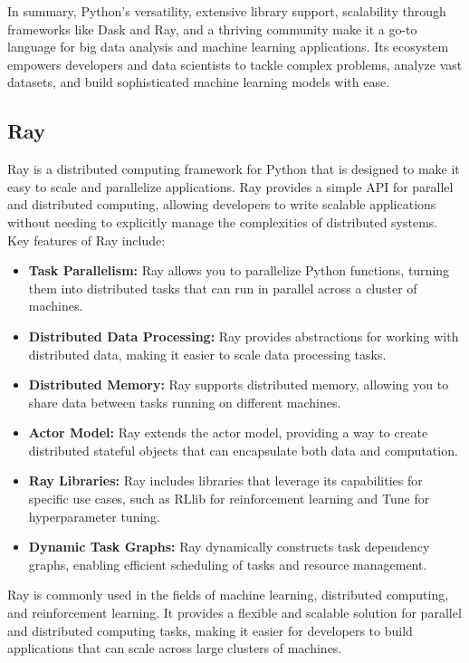 \documentclass[conference]{IEEEtran}
\begin{document}
In summary, Python's versatility, extensive library support, scalability through frameworks like Dask and Ray, and a thriving community make it a go-to language for big data analysis and machine learning applications. Its ecosystem empowers developers and data scientists to tackle complex problems, analyze vast datasets, and build sophisticated machine learning models with ease.

\subsection{Ray\cite{b5,b6}}
Ray is a distributed computing framework for Python that is designed to make it easy to scale and parallelize applications. Ray provides a simple API for parallel and distributed computing, allowing developers to write scalable applications without needing to explicitly manage the complexities of distributed systems. Key features of Ray include:
\begin{itemize}
\item \textbf{Task Parallelism:} Ray allows you to parallelize Python functions, turning them into distributed tasks that can run in parallel across a cluster of machines.
\item \textbf{Distributed Data Processing:} Ray provides abstractions for working with distributed data, making it easier to scale data processing tasks.
\item \textbf{Distributed Memory:} Ray supports distributed memory, allowing you to share data between tasks running on different machines.
\item \textbf{Actor Model:} Ray extends the actor model, providing a way to create distributed stateful objects that can encapsulate both data and computation.
\item \textbf{Ray Libraries:} Ray includes libraries that leverage its capabilities for specific use cases, such as RLlib for reinforcement learning and Tune for hyperparameter tuning.
\item \textbf{Dynamic Task Graphs:} Ray dynamically constructs task dependency graphs, enabling efficient scheduling of tasks and resource management.
\end{itemize}
Ray is commonly used in the fields of machine learning, distributed computing, and reinforcement learning. It provides a flexible and scalable solution for parallel and distributed computing tasks, making it easier for developers to build applications that can scale across large clusters of machines.
\end{document}
